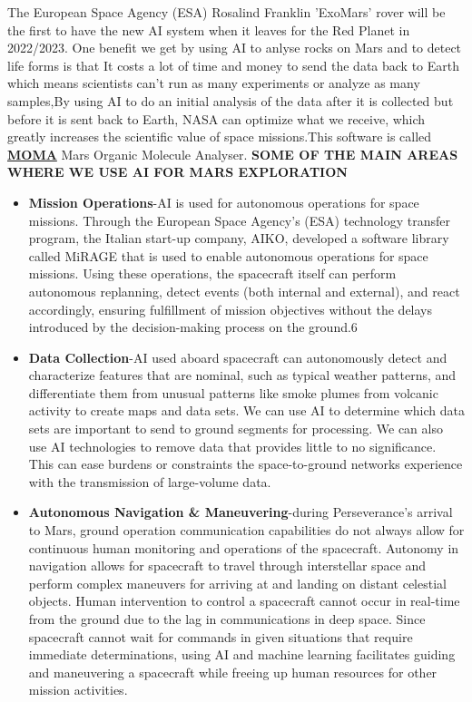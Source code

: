 \documentclass[a4paper]{article}
\begin{document}
The European Space Agency (ESA) Rosalind Franklin 'ExoMars' rover will be the first to have the new AI system when it leaves for the Red Planet in 2022/2023.
One benefit we get by using AI to anlyse rocks on Mars and to detect life forms is that It costs a lot of time and money to send the data back to Earth which means scientists can't run as many experiments or analyze as many samples,By using AI to do an initial analysis of the data after it is collected but before it is sent back to Earth, NASA can optimize what we receive, which greatly increases the scientific value of space missions.This software is called
\hyperlink{https://en.wikipedia.org/wiki/Mars_Organic_Molecule_Analyser}{\textbf{MOMA}} Mars Organic Molecule Analyser.
\textbf{SOME OF THE MAIN AREAS WHERE WE USE AI FOR MARS EXPLORATION}
\begin{itemize}
    \item \textbf{Mission Operations}-AI is used for autonomous operations for space missions. Through the European Space Agency’s (ESA) technology transfer program, the Italian start-up company, AIKO, developed a software library called MiRAGE that is used to enable autonomous operations for space missions. Using these operations, the spacecraft itself can perform autonomous replanning, detect events (both internal and external), and react accordingly, ensuring fulfillment of mission objectives without the delays introduced by the decision-making process on the ground.6
     \item \textbf{Data Collection}-AI used aboard spacecraft can autonomously detect and characterize features that are nominal, such as typical weather patterns, and differentiate them from unusual patterns like smoke plumes from volcanic activity to create maps and data sets. We can use AI to determine which data sets are important to send to ground segments for processing. We can also use AI technologies to remove data that provides little to no significance. This can ease burdens or constraints the space-to-ground networks experience with the transmission of large-volume data.
      \item \textbf{Autonomous Navigation & Maneuvering}-during Perseverance’s arrival to Mars, ground operation communication capabilities do not always allow for continuous human monitoring and operations of the spacecraft. Autonomy in navigation allows for spacecraft to travel through interstellar space and perform complex maneuvers for arriving at and landing on distant celestial objects. Human intervention to control a spacecraft cannot occur in real-time from the ground due to the lag in communications in deep space. Since spacecraft cannot wait for commands in given situations that require immediate determinations, using AI and machine learning facilitates guiding and maneuvering a spacecraft while freeing up human resources for other mission activities.
\end{itemize}
\end{document}
